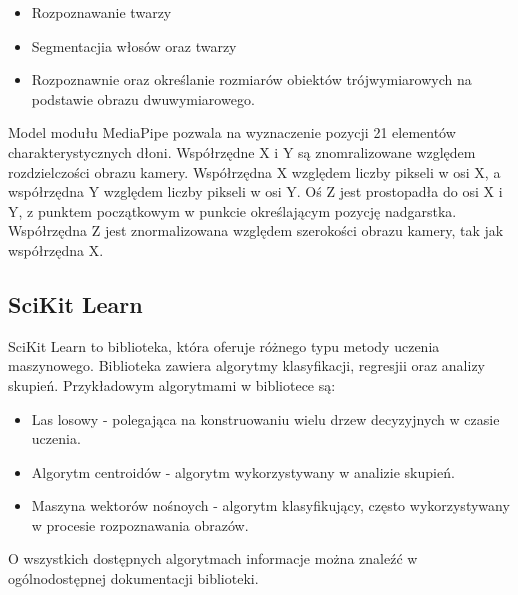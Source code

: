 \begin{itemize}
    \item Rozpoznawanie twarzy
    \item Segmentacjia włosów oraz twarzy
    \item Rozpoznawnie oraz określanie rozmiarów obiektów trójwymiarowych 
            na podstawie obrazu dwuwymiarowego. 
\end{itemize}

\quad Model modułu MediaPipe pozwala na wyznaczenie pozycji 21 elementów charakterystycznych dłoni. Współrzędne X i Y są znomralizowane względem rozdzielczości obrazu kamery. Współrzędna X względem liczby pikseli w osi X, a współrzędna Y względem liczby pikseli w osi Y. Oś Z jest prostopadła do osi X i Y, z punktem początkowym w punkcie określającym pozycję nadgarstka. Współrzędna Z jest znormalizowana względem szerokości obrazu kamery, tak jak współrzędna X. 

\subsection{SciKit Learn}

\quad SciKit Learn to biblioteka, która oferuje różnego typu metody uczenia maszynowego. Biblioteka zawiera algorytmy klasyfikacji, regresjii oraz analizy skupień. Przykładowym algorytmami w bibliotece są:
\begin{itemize}
    \item Las losowy - polegająca na konstruowaniu wielu drzew decyzyjnych w czasie uczenia. 
    \item Algorytm centroidów - algorytm wykorzystywany w analizie skupień.
    \item Maszyna wektorów nośnoych - algorytm klasyfikujący, często wykorzystywany w procesie rozpoznawania obrazów. 
\end{itemize}
O wszystkich dostępnych algorytmach informacje można znaleźć w ogólnodostępnej dokumentacji biblioteki. 


